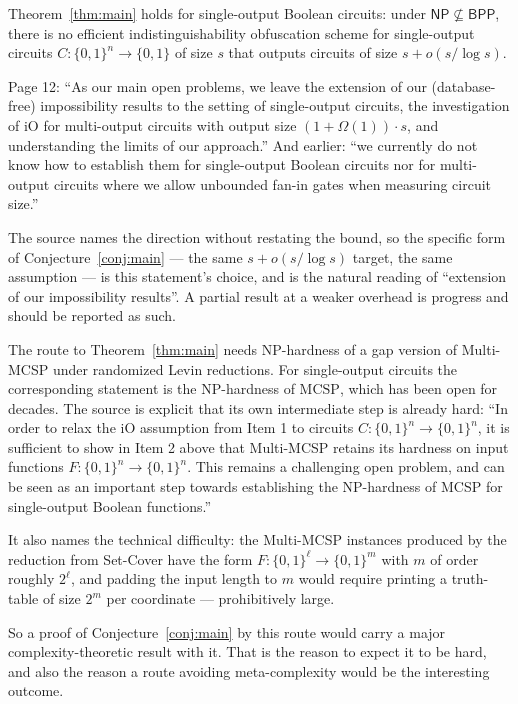 \documentclass{conjura-conjecture}
\newcommand{\Om}{\Omega}
\newcommand{\bits}{\{0,1\}}
\newcommand{\NP}{\mathsf{NP}}
\newcommand{\BPP}{\mathsf{BPP}}
\newcommand{\MCSP}{\mathrm{MCSP}}
\begin{document}
\begin{conjecture}\label{conj:main}
Theorem~\ref{thm:main} holds for single-output Boolean circuits: under
$\NP \not\subseteq \BPP$, there is no efficient indistinguishability
obfuscation scheme for single-output circuits $C : \bits^{n} \to \bits$
of size $s$ that outputs circuits of size $s + o(s/\log s)$.
\end{conjecture}

\begin{remark}\label{rem:framing}
Page 12: ``As our main open problems, we leave the extension of our
(database-free) impossibility results to the setting of single-output
circuits, the investigation of iO for multi-output circuits with output
size $(1 + \Om(1)) \cdot s$, and understanding the limits of our
approach.'' And earlier: ``we currently do not know how to establish them
for single-output Boolean circuits nor for multi-output circuits where we
allow unbounded fan-in gates when measuring circuit size.''

The source names the direction without restating the bound, so the
specific form of Conjecture~\ref{conj:main} --- the same $s + o(s/\log s)$
target, the same assumption --- is this statement's choice, and is the
natural reading of ``extension of our impossibility results''. A partial
result at a weaker overhead is progress and should be reported as such.
\end{remark}

\begin{remark}\label{rem:obstruction}
The route to Theorem~\ref{thm:main} needs NP-hardness of a gap version of
Multi-MCSP under randomized Levin reductions. For single-output circuits
the corresponding statement is the NP-hardness of $\MCSP$, which has been
open for decades. The source is explicit that its own intermediate step
is already hard: ``In order to relax the iO assumption from Item 1 to
circuits $C : \bits^{n} \to \bits^{n}$, it is sufficient to show in Item
2 above that Multi-MCSP retains its hardness on input functions $F :
\bits^{n} \to \bits^{n}$. This remains a challenging open problem, and
can be seen as an important step towards establishing the NP-hardness of
MCSP for single-output Boolean functions.''

It also names the technical difficulty: the Multi-MCSP instances produced
by the reduction from Set-Cover have the form $F : \bits^{\ell} \to
\bits^{m}$ with $m$ of order roughly $2^{\ell}$, and padding the input
length to $m$ would require printing a truth-table of size $2^{m}$ per
coordinate --- prohibitively large.

So a proof of Conjecture~\ref{conj:main} by this route would carry a
major complexity-theoretic result with it. That is the reason to expect
it to be hard, and also the reason a route avoiding meta-complexity would
be the interesting outcome.
\end{remark}
\end{document}
